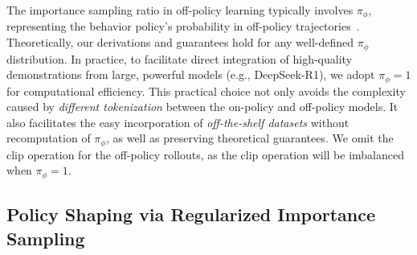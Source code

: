 \documentclass{article}
\begin{document}

The importance sampling ratio in off-policy learning typically involves $\pi_\phi$, representing the behavior policy's probability in off-policy trajectories~\cite{meng2023off}. 
Theoretically, our derivations and guarantees hold for any well-defined $\pi_\phi$ distribution. 
In practice, to facilitate direct integration of high-quality demonstrations from large, powerful models (e.g., DeepSeek-R1), we adopt $\pi_\phi=1$ for computational efficiency. 
This practical choice not only avoids the complexity caused by \textit{different tokenization} between the on-policy and off-policy models. It also facilitates the easy incorporation of \textit{off-the-shelf datasets} without recomputation of $\pi_\phi$, as well as preserving theoretical guarantees. 
We omit the clip operation for the off-policy rollouts, as the clip operation will be imbalanced when $\pi_{\phi}=1$.



\subsection{Policy Shaping via Regularized Importance Sampling}
\label{sec:shaping}
\end{document}
